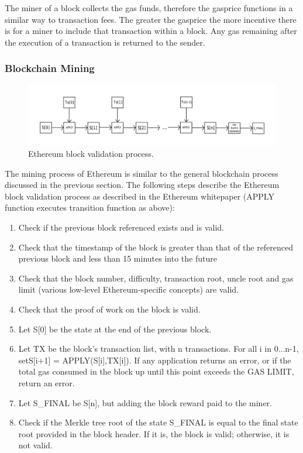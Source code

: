 The miner of a block collects the gas funds, therefore the gasprice functions in a similar way to transaction fees. The greater the gasprice the more incentive there is for a miner to include that transaction within a block. Any gas remaining after the execution of a transaction is returned to the sender.\\ 

\subsubsection{Blockchain Mining}
\begin{figure}
\centering
\includegraphics[width=\textwidth]{Figures/ethereum_state_transition}
\decoRule
\caption[Ethereum Block Validation Process]{Ethereum block validation process.}
\label{fig:ethereum_state_transition}
\end{figure}
The mining process of Ethereum is similar to the general blockchain process discussed in the previous section. The following steps describe the Ethereum block validation process as described in the Ethereum whitepaper (APPLY function executes transition function as above):

\begin{enumerate}
\item Check if the previous block referenced exists and is valid.


\item Check that the timestamp of the block is greater than that of the referenced previous block and less than 15 minutes into the future


\item Check that the block number, difficulty, transaction root, uncle root and gas limit (various low-level Ethereum-specific concepts) are valid.


\item Check that the proof of work on the block is valid.


\item Let S[0] be the state at the end of the previous block.


\item Let TX be the block's transaction list, with n transactions. For all i in 0...n-1, setS[i+1] = APPLY(S[i],TX[i]). If any application returns an error, or if the total gas consumed in the block up until this point exceeds the GAS LIMIT, return an error.


\item Let S\_FINAL be S[n], but adding the block reward paid to the miner.


\item Check if the Merkle tree root of the state S\_FINAL is equal to the final state root provided in the block header. If it is, the block is valid; otherwise, it is not valid.

\end{enumerate}


